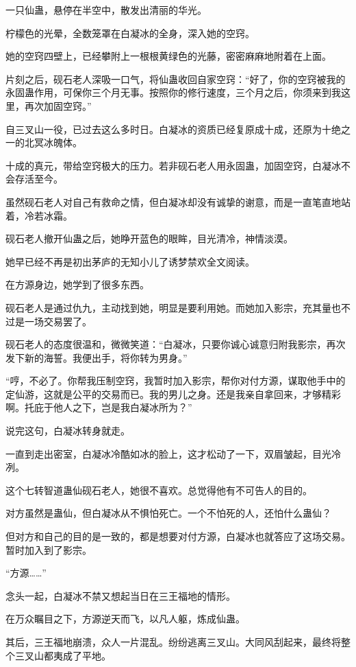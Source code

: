 
\begin{this_body}

一只仙蛊，悬停在半空中，散发出清丽的华光。

柠檬色的光晕，全数笼罩在白凝冰的全身，深入她的空窍。

她的空窍四壁上，已经攀附上一根根黄绿色的光藤，密密麻麻地附着在上面。

片刻之后，砚石老人深吸一口气，将仙蛊收回自家空窍：“好了，你的空窍被我的永固蛊作用，可保你三个月无事。按照你的修行速度，三个月之后，你须来到我这里，再次加固空窍。”

自三叉山一役，已过去这么多时日。白凝冰的资质已经复原成十成，还原为十绝之一的北冥冰魄体。

十成的真元，带给空窍极大的压力。若非砚石老人用永固蛊，加固空窍，白凝冰不会存活至今。

虽然砚石老人对自己有救命之情，但白凝冰却没有诚挚的谢意，而是一直笔直地站着，冷若冰霜。

砚石老人撤开仙蛊之后，她睁开蓝色的眼眸，目光清冷，神情淡漠。

她早已经不再是初出茅庐的无知小儿了诱梦禁欢全文阅读。

在方源身边，她学到了很多东西。

砚石老人是通过仇九，主动找到她，明显是要利用她。而她加入影宗，充其量也不过是一场交易罢了。

砚石老人的态度很温和，微微笑道：“白凝冰，只要你诚心诚意归附我影宗，再次发下新的海誓。我便出手，将你转为男身。”

“哼，不必了。你帮我压制空窍，我暂时加入影宗，帮你对付方源，谋取他手中的定仙游，这就是公平的交易而已。我的男儿之身。还是我亲自拿回来，才够精彩啊。托庇于他人之下，岂是我白凝冰所为？”

说完这句，白凝冰转身就走。

一直到走出密室，白凝冰冷酷如冰的脸上，这才松动了一下，双眉皱起，目光冷冽。

这个七转智道蛊仙砚石老人，她很不喜欢。总觉得他有不可告人的目的。

对方虽然是蛊仙，但白凝冰从不惧怕死亡。一个不怕死的人，还怕什么蛊仙？

但对方和自己的目的是一致的，都是想要对付方源，白凝冰也就答应了这场交易。暂时加入到了影宗。

“方源……”

念头一起，白凝冰不禁又想起当日在三王福地的情形。

在万众瞩目之下，方源逆天而飞，以凡人躯，炼成仙蛊。

其后，三王福地崩溃，众人一片混乱。纷纷逃离三叉山。大同风刮起来，最终将整个三叉山都夷成了平地。


\end{this_body}
